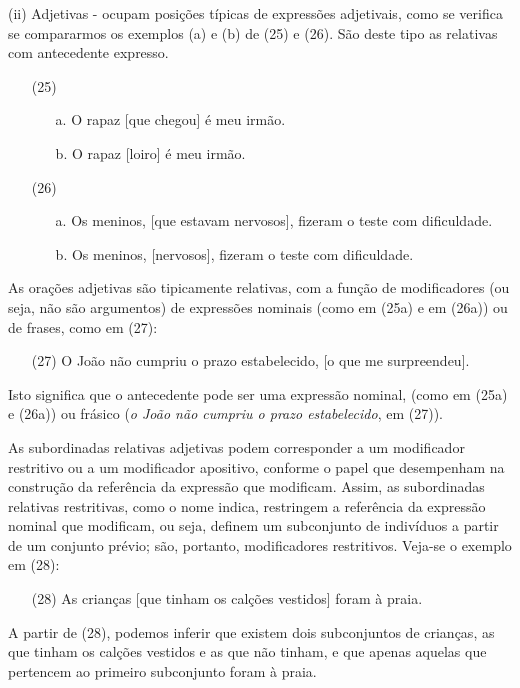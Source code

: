 \documentclass[output=paper,colorlinks,citecolor=brown,booklanguage=portuguese]{langscibook}
\begin{document}
(ii) Adjetivas - ocupam posições típicas de expressões adjetivais, como se verifica se compararmos os exemplos (a) e (b) de (25) e (26). São deste tipo as relativas com antecedente expresso.

\begin{enumerate}[align=left]
    \item[(25)]
    \begin{enumerate}
        \item [a.] O rapaz [que chegou] é meu irmão.
	\item[b.] O rapaz [loiro] é meu irmão.
	\end{enumerate}
\item[(26)]
\begin{enumerate}
\item[a.] Os meninos, [que estavam nervosos], fizeram o teste com dificuldade.
\item	[b.] Os meninos, [nervosos], fizeram o teste com dificuldade.
    \end{enumerate}
\end{enumerate}
As orações adjetivas são tipicamente relativas, com a função de modificadores (ou seja, não são argumentos) de expressões nominais (como em (25a) e em (26a)) ou de frases, como em (27):
\begin{enumerate}[align=left]
    \item [(27)] O João não cumpriu o prazo estabelecido, [o que me surpreendeu].
\end{enumerate}

Isto significa que o antecedente pode ser uma expressão nominal, (como em (25a) e (26a)) ou frásico (\emph{o João não cumpriu o prazo estabelecido}, em (27)). 

As subordinadas relativas adjetivas podem corresponder a um modificador restritivo ou a um modificador apositivo, conforme o papel que desempenham na construção da referência da expressão que modificam. Assim, as subordinadas relativas restritivas, como o nome indica, restringem a referência da expressão nominal que modificam, ou seja, definem um subconjunto de indivíduos a partir de um conjunto prévio; são, portanto, modificadores restritivos. Veja-se o exemplo em (28):

\begin{enumerate}[align=left]
    \item [(28)] As crianças [que tinham os calções vestidos] foram à praia.
\end{enumerate}

A partir de (28), podemos inferir que existem dois subconjuntos de crianças, as que tinham os calções vestidos e as que não tinham, e que apenas aquelas que pertencem ao primeiro subconjunto foram à praia.
\end{document}
